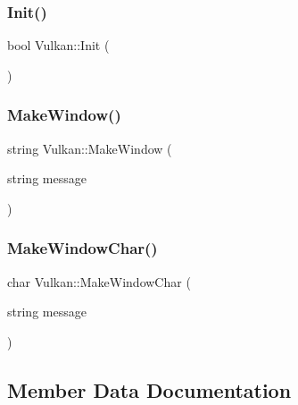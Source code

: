 \mbox{\label{classVulkan_a308c68e03405bc740435a2af62cc7434}} 
\subsubsection{\texorpdfstring{Init()}{Init()}}
{\footnotesize\ttfamily bool Vulkan\+::\+Init (\begin{DoxyParamCaption}{ }\end{DoxyParamCaption})}

\mbox{\label{classVulkan_a46c4ec53f8960a1fa3f3eb63d7755654}} 
\subsubsection{\texorpdfstring{Make\+Window()}{MakeWindow()}}
{\footnotesize\ttfamily string Vulkan\+::\+Make\+Window (\begin{DoxyParamCaption}\item[{string}]{message }\end{DoxyParamCaption})}

\mbox{\label{classVulkan_a70565678cd6771ac57706ff8586e256f}} 
\subsubsection{\texorpdfstring{Make\+Window\+Char()}{MakeWindowChar()}}
{\footnotesize\ttfamily char Vulkan\+::\+Make\+Window\+Char (\begin{DoxyParamCaption}\item[{string}]{message }\end{DoxyParamCaption})}



\subsection{Member Data Documentation}
\mbox{\label{classVulkan_aa19833e837744cc2f6b1f93c1d66a693}} 
